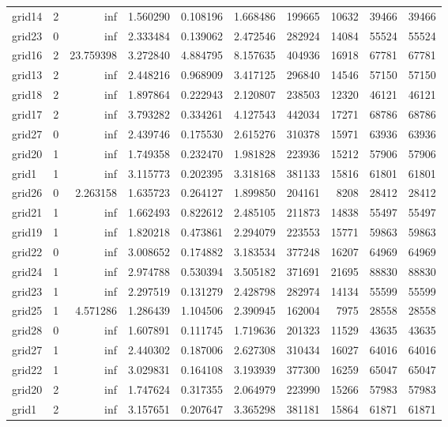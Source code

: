 \documentclass[../../../thesis.tex]{subfiles}
\begin{document}
\begin{longtable}{|l|r|r|r|r|r|r|r|r|r|}
grid14 & 2 & inf & 1.560290 & 0.108196 & 1.668486 & 199665 & 10632 & 39466 & 39466 \\
grid23 & 0 & inf & 2.333484 & 0.139062 & 2.472546 & 282924 & 14084 & 55524 & 55524 \\
grid16 & 2 & 23.759398 & 3.272840 & 4.884795 & 8.157635 & 404936 & 16918 & 67781 & 67781 \\
grid13 & 2 & inf & 2.448216 & 0.968909 & 3.417125 & 296840 & 14546 & 57150 & 57150 \\
grid18 & 2 & inf & 1.897864 & 0.222943 & 2.120807 & 238503 & 12320 & 46121 & 46121 \\
grid17 & 2 & inf & 3.793282 & 0.334261 & 4.127543 & 442034 & 17271 & 68786 & 68786 \\
grid27 & 0 & inf & 2.439746 & 0.175530 & 2.615276 & 310378 & 15971 & 63936 & 63936 \\
grid20 & 1 & inf & 1.749358 & 0.232470 & 1.981828 & 223936 & 15212 & 57906 & 57906 \\
grid1 & 1 & inf & 3.115773 & 0.202395 & 3.318168 & 381133 & 15816 & 61801 & 61801 \\
grid26 & 0 & 2.263158 & 1.635723 & 0.264127 & 1.899850 & 204161 & 8208 & 28412 & 28412 \\
grid21 & 1 & inf & 1.662493 & 0.822612 & 2.485105 & 211873 & 14838 & 55497 & 55497 \\
grid19 & 1 & inf & 1.820218 & 0.473861 & 2.294079 & 223553 & 15771 & 59863 & 59863 \\
grid22 & 0 & inf & 3.008652 & 0.174882 & 3.183534 & 377248 & 16207 & 64969 & 64969 \\
grid24 & 1 & inf & 2.974788 & 0.530394 & 3.505182 & 371691 & 21695 & 88830 & 88830 \\
grid23 & 1 & inf & 2.297519 & 0.131279 & 2.428798 & 282974 & 14134 & 55599 & 55599 \\
grid25 & 1 & 4.571286 & 1.286439 & 1.104506 & 2.390945 & 162004 & 7975 & 28558 & 28558 \\
grid28 & 0 & inf & 1.607891 & 0.111745 & 1.719636 & 201323 & 11529 & 43635 & 43635 \\
grid27 & 1 & inf & 2.440302 & 0.187006 & 2.627308 & 310434 & 16027 & 64016 & 64016 \\
grid22 & 1 & inf & 3.029831 & 0.164108 & 3.193939 & 377300 & 16259 & 65047 & 65047 \\
grid20 & 2 & inf & 1.747624 & 0.317355 & 2.064979 & 223990 & 15266 & 57983 & 57983 \\
grid1 & 2 & inf & 3.157651 & 0.207647 & 3.365298 & 381181 & 15864 & 61871 & 61871 \\

\end{longtable}
\end{document}
